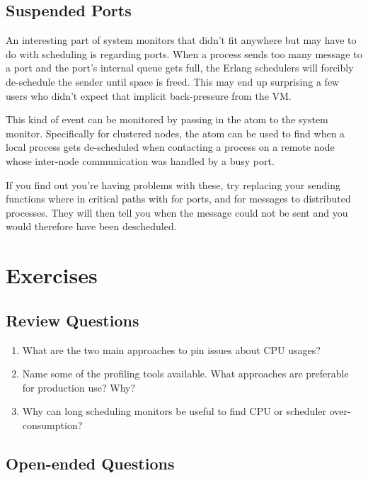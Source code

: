 \subsection{Suspended Ports}
\label{subsec:port-system-monitors}

An interesting part of system monitors that didn't fit anywhere but may have to do with scheduling is regarding ports. When a process sends too many message to a port and the port's internal queue gets full, the Erlang schedulers will forcibly de-schedule the sender until space is freed. This may end up surprising a few users who didn't expect that implicit back-pressure from the VM.

This kind of event can be monitored by passing in the atom  to the system monitor. Specifically for clustered nodes, the atom  can be used to find when a local process gets de-scheduled when contacting a process on a remote node whose inter-node communication was handled by a busy port.

If you find out you're having problems with these, try replacing your sending functions where in critical paths with  for ports, and  for messages to distributed processes. They will then tell you when the message could not be sent and you would therefore have been descheduled.


\section{Exercises}

\subsection*{Review Questions}

\begin{enumerate}
	\item What are the two main approaches to pin issues about CPU usages?
	\item Name some of the profiling tools available. What approaches are preferable for production use? Why?
	\item Why can long scheduling monitors be useful to find CPU or scheduler over-consumption?

\end{enumerate}

\subsection*{Open-ended Questions}

